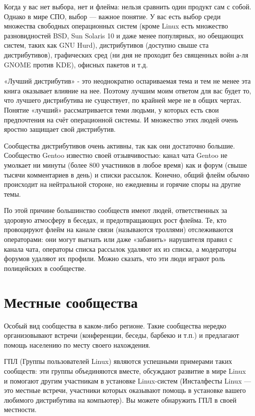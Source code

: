 \documentclass[10pt]{book}
\begin{document}
Когда у вас нет выбора, нет и флейма: нельзя сравнить один продукт сам с собой. Однако в мире СПО, выбор — важное понятие. У вас есть выбор среди множества свободных операционных систем (кроме Linux есть множество разновидностей BSD, Sun Solaris 10 и даже менее популярных, но обещающих систем, таких как GNU Hurd), дистрибутивов (доступно свыше ста дистрибутивов), графических сред (ни дня не проходит без священных войн  а-ля GNOME против KDE), офисных пакетов и т.д.

«Лучший дистрибутив» - это неоднократно оспариваемая тема и тем не менее эта книга оказывает влияние на нее. Поэтому лучшим моим ответом для вас будет то, что лучшего дистрибутива не существует, по крайней мере не в общих чертах. Понятие «лучший» рассматривается теми людьми, у которых есть свои предпочтения на счёт операционной системы. И множество этих людей очень яростно защищает свой дистрибутив. 

Сообщества дистрибутивов очень активны, так как они достаточно большие. Сообщество Gentoo известно своей отзывчивостью: канал чата Gentoo не умолкает ни минуты (более 800 участников в любое время) как и форум (свыше тысячи комментариев в день) и списки рассылок. Конечно, общий флейм обычно происходит на нейтральной стороне, но ежедневны и горячие споры на другие темы. 

По этой причине большинство сообществ имеют людей, ответственных за здоровую атмосферу в беседах, и предотвращающих рост флейма. Те, кто провоцируют флейм на канале связи (называются троллями) отслеживаются операторами: они могут выгнать или даже «забанить» нарушителя правил с канала чата, операторы списка рассылок удаляют их из списка, а модераторы форумов удаляют их профили. Можно сказать, что эти люди играют роль полицейских в сообществе. 

\section{Местные сообщества}

Особый вид сообщества в каком-либо регионе. Такие сообщества нередко организовывают встречи (конференции, беседы, барбекю и т.п.) и предлагают помощь населению по месту своего нахождения. 

ГПЛ (Группы пользователей Linux) являются успешными примерами таких сообществ: эти группы объединяются вместе, обсуждают развитие в мире Linux и помогают другим участникам в установке Linux-систем (Инсталфесты Linux — это местные встречи, участники которых оказывают помощь в установке вашего любимого дистрибутива на компьютер). Вы можете обнаружить ГПЛ в своей местности. 
\end{document}
